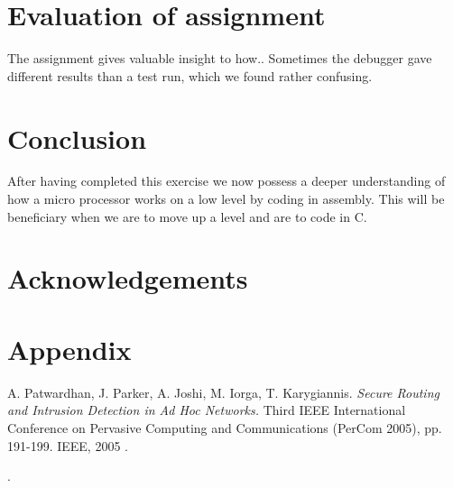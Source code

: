 \documentclass[a4paper,11pt]{article}
\begin{document}
\section{Evaluation of assignment}
The assignment gives valuable insight to how..
Sometimes the debugger gave different results than a test run, which we found rather confusing. 

\section{Conclusion}
After having completed this exercise we now possess a deeper understanding of how a micro processor works on a low level by coding in assembly. This will be beneficiary when we are to move up a level and are to code in C. 

\section{Acknowledgements}

\section{Appendix}


\footnotesize{  %
\begin{thebibliography}{N}

 A. Patwardhan, J. Parker, A. Joshi, M. Iorga, T. Karygiannis.
\textit{Secure Routing and Intrusion Detection in Ad Hoc Networks.}
Third IEEE International Conference on Pervasive Computing and Communications (PerCom 2005), pp. 191-199. IEEE, 2005 .


\end{thebibliography}.  
}
\end{document}
